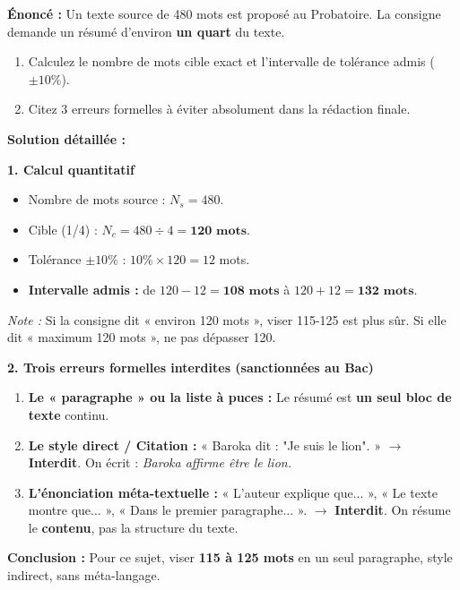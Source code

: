 \documentclass[11pt]{article}
\begin{document}
\begin{exoresolu}
    \textbf{Énoncé :} Un texte source de 480 mots est proposé au Probatoire. La consigne demande un résumé d'environ \textbf{un quart} du texte.
    \begin{enumerate}
        \item Calculez le nombre de mots cible exact et l'intervalle de tolérance admis ($\pm 10\%$).
        \item Citez 3 erreurs formelles à éviter absolument dans la rédaction finale.
    \end{enumerate}
    \tcblower
    \textbf{Solution détaillée :}
    
    \textbf{1. Calcul quantitatif}
    \begin{itemize}
        \item Nombre de mots source : $N_s = 480$.
        \item Cible (1/4) : $N_c = 480 \div 4 = \textbf{120 mots}$.
        \item Tolérance $\pm 10\%$ : $10\% \times 120 = 12$ mots.
        \item \textbf{Intervalle admis :} de $120 - 12 = \textbf{108 mots}$ à $120 + 12 = \textbf{132 mots}$.
    \end{itemize}
    \textit{Note :} Si la consigne dit « environ 120 mots », viser 115-125 est plus sûr. Si elle dit « maximum 120 mots », ne pas dépasser 120.
    
    \textbf{2. Trois erreurs formelles interdites (sanctionnées au Bac)}
    \begin{enumerate}
        \item \textbf{Le « paragraphe » ou la liste à puces :} Le résumé est \textbf{un seul bloc de texte} continu.
        \item \textbf{Le style direct / Citation :} « Baroka dit : "Je suis le lion". » $\rightarrow$ \textbf{Interdit}. On écrit : \emph{Baroka affirme être le lion.}
        \item \textbf{L'énonciation méta-textuelle :} « L'auteur explique que... », « Le texte montre que... », « Dans le premier paragraphe... ». $\rightarrow$ \textbf{Interdit}. On résume le \textbf{contenu}, pas la structure du texte.
    \end{enumerate}
    
    \textbf{Conclusion :} Pour ce sujet, viser \textbf{115 à 125 mots} en un seul paragraphe, style indirect, sans méta-langage.
\end{exoresolu}
\end{document}
